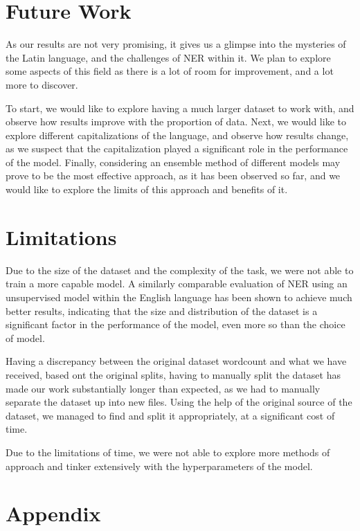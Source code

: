 \documentclass[11pt]{article}
\begin{document}
\section{Future Work}

As our results are not very promising, it gives us a glimpse into the mysteries of the Latin language, and the challenges of NER within it.
We plan to explore some aspects of this field as there is a lot of room for improvement, and a lot more to discover.

To start, we would like to explore having a much larger dataset to work with, and observe how results improve with the proportion of data.
Next, we would like to explore different capitalizations of the language, and observe how results change, as we
suspect that the capitalization played a significant role in the performance of the model.
Finally, considering an ensemble method of different models may prove to be the most effective approach, as it has been observed so far,
and we would like to explore the limits of this approach and benefits of it.

\newpage
\section*{Limitations}

Due to the size of the dataset and the complexity of the task, we were not able to train a more capable model.
A similarly comparable evaluation of NER using an unsupervised model within the English language has been shown to achieve much better results,
indicating that the size and distribution of the dataset is a significant factor in the performance of the model, even more so than the choice of model.

Having a discrepancy between the original dataset wordcount and what we have received, based ont the original splits, having to
manually split the dataset has made our work substantially longer than expected, as we had to manually separate the dataset up into
new files. Using the help of the original source of the dataset, we managed to find and split it appropriately, at a significant cost of time.

Due to the limitations of time, we were not able to explore more methods of approach and tinker extensively with the hyperparameters of the model.

\appendix

\section{Appendix}
\label{sec:appendix}
\end{document}
